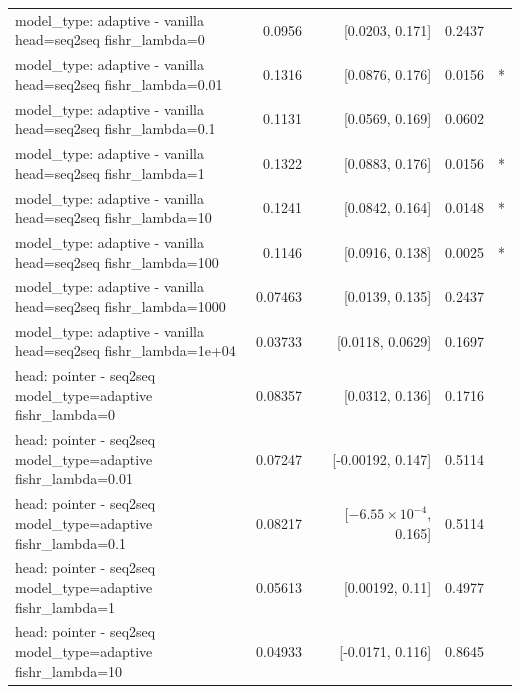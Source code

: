 \documentclass[10pt]{article}
\makeatletter
\newcommand{\stackcell}[1]{\begin{tabular}[t]{@{}l@{}}#1\end{tabular}}
\makeatother
\begin{document}
{\begin{longtable}{lrrrl}
\stackcell{model\_type: adaptive - vanilla\\\footnotesize head=seq2seq fishr\_lambda=0 } & 0.0956 & [0.0203, 0.171] & 0.2437 & \\
\stackcell{model\_type: adaptive - vanilla\\\footnotesize head=seq2seq fishr\_lambda=0.01 } & 0.1316 & [0.0876, 0.176] & 0.0156 & *\\
\stackcell{model\_type: adaptive - vanilla\\\footnotesize head=seq2seq fishr\_lambda=0.1 } & 0.1131 & [0.0569, 0.169] & 0.0602 & \\
\stackcell{model\_type: adaptive - vanilla\\\footnotesize head=seq2seq fishr\_lambda=1 } & 0.1322 & [0.0883, 0.176] & 0.0156 & *\\
\stackcell{model\_type: adaptive - vanilla\\\footnotesize head=seq2seq fishr\_lambda=10 } & 0.1241 & [0.0842, 0.164] & 0.0148 & *\\
\stackcell{model\_type: adaptive - vanilla\\\footnotesize head=seq2seq fishr\_lambda=100 } & 0.1146 & [0.0916, 0.138] & 0.0025 & *\\
\stackcell{model\_type: adaptive - vanilla\\\footnotesize head=seq2seq fishr\_lambda=1000 } & 0.07463 & [0.0139, 0.135] & 0.2437 & \\
\stackcell{model\_type: adaptive - vanilla\\\footnotesize head=seq2seq fishr\_lambda=1e+04 } & 0.03733 & [0.0118, 0.0629] & 0.1697 & \\
\stackcell{head: pointer - seq2seq\\\footnotesize model\_type=adaptive fishr\_lambda=0 } & 0.08357 & [0.0312, 0.136] & 0.1716 & \\
\stackcell{head: pointer - seq2seq\\\footnotesize model\_type=adaptive fishr\_lambda=0.01 } & 0.07247 & [-0.00192, 0.147] & 0.5114 & \\
\stackcell{head: pointer - seq2seq\\\footnotesize model\_type=adaptive fishr\_lambda=0.1 } & 0.08217 & [$-6.55\times10^{-4}$, 0.165] & 0.5114 & \\
\stackcell{head: pointer - seq2seq\\\footnotesize model\_type=adaptive fishr\_lambda=1 } & 0.05613 & [0.00192, 0.11] & 0.4977 & \\
\stackcell{head: pointer - seq2seq\\\footnotesize model\_type=adaptive fishr\_lambda=10 } & 0.04933 & [-0.0171, 0.116] & 0.8645 & \\

\end{longtable}}
\end{document}
